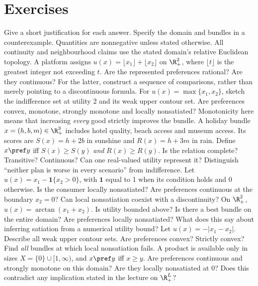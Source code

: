 \section*{Exercises}
Give a short justification for each answer. Specify the domain and bundles in a counterexample. Quantities are nonnegative unless stated otherwise. All continuity and neighbourhood claims use the stated domain's relative Euclidean topology.
A platform assigns $u(x)=\lfloor x_1\rfloor+\lfloor x_2\rfloor$ on $\R_+^2$, where $\lfloor t\rfloor$ is the greatest integer not exceeding $t$. Are the represented preferences rational? Are they continuous? For the latter, construct a sequence of comparisons, rather than merely pointing to a discontinuous formula.
For $u(x)=\max\{x_1,x_2\}$, sketch the indifference set at utility 2 and its weak upper contour set. Are preferences convex, monotone, strongly monotone and locally nonsatiated? Monotonicity here means that increasing \emph{every} good strictly improves the bundle.
A holiday bundle $x=(h,b,m)\in\R_+^3$ includes hotel quality, beach access and museum access. Its scores are $S(x)=h+2b$ in sunshine and $R(x)=h+3m$ in rain. Define $x\pref y$ iff $S(x)\ge S(y)$ \emph{and} $R(x)\ge R(y)$. Is the relation complete? Transitive? Continuous? Can one real-valued utility represent it? Distinguish ``neither plan is worse in every scenario'' from indifference.
Let $u(x)=x_1-\mathbf1\{x_2>0\}$, with $\mathbf1$ equal to 1 when its condition holds and 0 otherwise. Is the consumer locally nonsatiated? Are preferences continuous at the boundary $x_2=0$? Can local nonsatiation coexist with a discontinuity?
On $\R_+^2$, $u(x)=\arctan(x_1+x_2)$. Is utility bounded above? Is there a best bundle on the entire domain? Are preferences locally nonsatiated? What does this say about inferring satiation from a numerical utility bound?
Let $u(x)=-|x_1-x_2|$. Describe all weak upper contour sets. Are preferences convex? Strictly convex? Find \emph{all} bundles at which local nonsatiation fails.
A product is available only in sizes $X=\{0\}\cup[1,\infty)$, and $x\pref y$ iff $x\ge y$. Are preferences continuous and strongly monotone on this domain? Are they locally nonsatiated at 0? Does this contradict any implication stated in the lecture on $\R_+^L$?
\clearpage
{}
